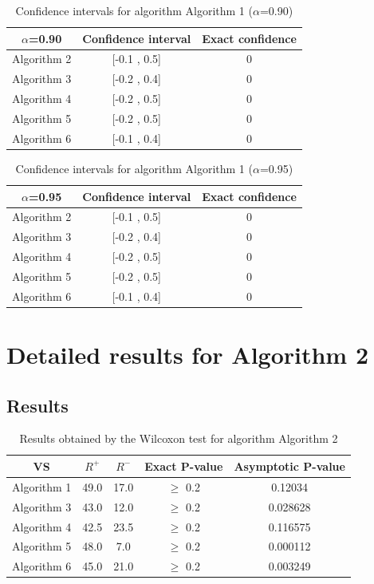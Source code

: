 \documentclass[a4paper,10pt]{article}
\begin{document}
\begin{table}[!htp]
\centering\small
\begin{tabular}{
|c|c|c|}
\hline
 $\alpha$=0.90 & Confidence interval & Exact confidence \\ \hline 
Algorithm 2 & [-0.1 , 0.5] & 0\\ \hline 
Algorithm 3 & [-0.2 , 0.4] & 0\\ \hline 
Algorithm 4 & [-0.2 , 0.5] & 0\\ \hline 
Algorithm 5 & [-0.2 , 0.5] & 0\\ \hline 
Algorithm 6 & [-0.1 , 0.4] & 0\\ \hline 

\end{tabular}
\caption{Confidence intervals for algorithm Algorithm 1 ($\alpha$=0.90)}
\end{table}
\begin{table}[!htp]
\centering\small
\begin{tabular}{
|c|c|c|}
\hline
 $\alpha$=0.95 & Confidence interval & Exact confidence \\ \hline 
Algorithm 2 & [-0.1 , 0.5] & 0\\ \hline 
Algorithm 3 & [-0.2 , 0.4] & 0\\ \hline 
Algorithm 4 & [-0.2 , 0.5] & 0\\ \hline 
Algorithm 5 & [-0.2 , 0.5] & 0\\ \hline 
Algorithm 6 & [-0.1 , 0.4] & 0\\ \hline 

\end{tabular}
\caption{Confidence intervals for algorithm Algorithm 1 ($\alpha$=0.95)}
\end{table}

 \clearpage 


\section{Detailed results for Algorithm 2}


\subsection{Results}

\begin{table}[!htp]
\centering\small
\begin{tabular}{
|c|c|c|c|c|}
\hline
 VS & $R^{+}$ & $R^{-}$ & Exact P-value & Asymptotic P-value \\ \hline 
Algorithm 1 & 49.0 & 17.0 & $\geq$ 0.2 & 0.12034\\ \hline 
Algorithm 3 & 43.0 & 12.0 & $\geq$ 0.2 & 0.028628\\ \hline 
Algorithm 4 & 42.5 & 23.5 & $\geq$ 0.2 & 0.116575\\ \hline 
Algorithm 5 & 48.0 & 7.0 & $\geq$ 0.2 & 0.000112\\ \hline 
Algorithm 6 & 45.0 & 21.0 & $\geq$ 0.2 & 0.003249\\ \hline 

\end{tabular}
\caption{Results obtained by the Wilcoxon test for algorithm Algorithm 2}
\end{table}
\end{document}
